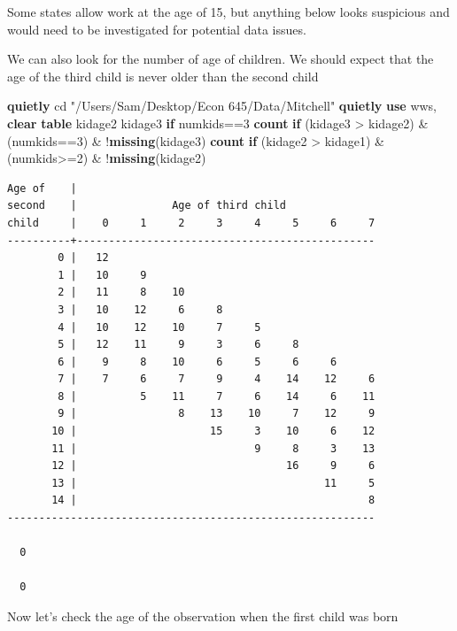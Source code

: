\documentclass[
]{book}
\newenvironment{Shaded}{\begin{snugshade}}{\end{snugshade}}
\newcommand{\FunctionTok}[1]{\textcolor[rgb]{0.13,0.29,0.53}{\textbf{#1}}}
\newcommand{\KeywordTok}[1]{\textcolor[rgb]{0.13,0.29,0.53}{\textbf{#1}}}
\newcommand{\NormalTok}[1]{#1}
\newcommand{\StringTok}[1]{\textcolor[rgb]{0.31,0.60,0.02}{#1}}
\begin{document}
Some states allow work at the age of 15, but anything below looks suspicious and would need to be investigated for potential data issues.

We can also look for the number of age of children. We should expect that
the age of the third child is never older than the second child

\begin{Shaded}
\begin{Highlighting}[]
\KeywordTok{quietly}\NormalTok{ cd }\StringTok{"/Users/Sam/Desktop/Econ 645/Data/Mitchell"}
\KeywordTok{quietly} \KeywordTok{use}\NormalTok{ wws, }\KeywordTok{clear}
\KeywordTok{table}\NormalTok{ kidage2 kidage3 }\KeywordTok{if}\NormalTok{ numkids==3}
\FunctionTok{count} \KeywordTok{if}\NormalTok{ (kidage3 \textgreater{} kidage2) \& (numkids==3) \& !}\FunctionTok{missing}\NormalTok{(kidage3)}
\FunctionTok{count} \KeywordTok{if}\NormalTok{ (kidage2 \textgreater{} kidage1) \& (numkids\textgreater{}=2) \& !}\FunctionTok{missing}\NormalTok{(kidage2)}
\end{Highlighting}
\end{Shaded}

\begin{verbatim}
Age of    |
second    |               Age of third child              
child     |    0     1     2     3     4     5     6     7
----------+-----------------------------------------------
        0 |   12                                          
        1 |   10     9                                    
        2 |   11     8    10                              
        3 |   10    12     6     8                        
        4 |   10    12    10     7     5                  
        5 |   12    11     9     3     6     8            
        6 |    9     8    10     6     5     6     6      
        7 |    7     6     7     9     4    14    12     6
        8 |          5    11     7     6    14     6    11
        9 |                8    13    10     7    12     9
       10 |                     15     3    10     6    12
       11 |                            9     8     3    13
       12 |                                 16     9     6
       13 |                                       11     5
       14 |                                              8
----------------------------------------------------------

  0

  0
\end{verbatim}

Now let's check the age of the observation when the first child was born
\end{document}
